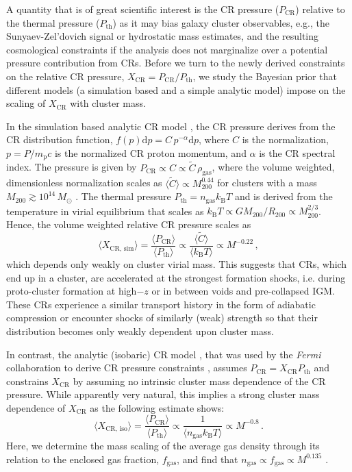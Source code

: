 \documentclass[10pt,aps,pra,reprint,amsmath,amsfonts,amssymb,showpacs,nofootinbib,floatfix]{revtex4-1}
\newcommand{\Fermi}{{\em Fermi}\xspace}
\newcommand{\rmn}{\mathrm}
\newcommand{\msun}{M_\odot}
\newcommand{\B}{\rmn{B}}
\newcommand{\bra}{\langle}
\newcommand{\ket}{\rangle}
\newcommand{\dd}{\rmn{d}}
\newcommand{\CR}{\rmn{CR}}
\newcommand{\mvir}{M_{200}}
\begin{document}
A quantity that is of great scientific interest is the CR pressure
($P_\CR$) relative to the thermal pressure ($P_\rmn{th}$) as it may
bias galaxy cluster observables, e.g., the Sunyaev-Zel’dovich signal
or hydrostatic mass estimates, and the resulting cosmological
constraints if the analysis does not marginalize over a potential
pressure contribution from CRs. Before we turn to the newly derived
constraints on the relative CR pressure, $X_\CR = P_\CR/P_\rmn{th}$,
we study the Bayesian prior that different models (a simulation based
and a simple analytic model) impose on the scaling of $X_\CR$ with
cluster mass.

In the simulation based analytic CR model \cite{2010MNRAS.409..449P},
the CR pressure derives from the CR distribution function, $f(p)\dd p =
C\,p^{-\alpha}\dd p$, where $C$ is the normalization, $p=P/m_\rmn{p}
c$ is the normalized CR proton momentum, and $\alpha$ is the CR
spectral index. The pressure is given by $P_\CR \propto C\propto
\tilde{C} \,\rho_\rmn{gas}$, where the volume weighted, dimensionless
normalization scales as $\bra\tilde{C}\ket\propto \mvir^{0.44}$ for clusters
with a mass $\mvir\gtrsim 10^{14}\,\msun$
\cite{2010MNRAS.409..449P}. The thermal pressure $P_\rmn{th} =
n_\rmn{gas} k_\B T$ and is derived from the temperature in virial
equilibrium that scales as $k_\B T \propto G \mvir/R_{200} \propto
\mvir^{2/3}$. Hence, the volume weighted relative CR pressure scales
as
\begin{equation}
    \bra X_{\CR,\,\rmn{sim}}\ket = \frac{\bra P_\CR\ket}{\bra
      P_\rmn{th}\ket} \propto \frac{\bra\tilde{C}\ket}{\bra k_\B
      T\ket} \propto M^{-0.22}\,,
\end{equation}
which depends only weakly on cluster virial mass. This suggests that
CRs, which end up in a cluster, are accelerated at the strongest
formation shocks, i.e. during proto-cluster formation at high$-z$ or
in between voids and pre-collapsed IGM. These CRs experience a
similar transport history in the form of adiabatic compression or
encounter shocks of similarly (weak) strength so that their
distribution becomes only weakly dependent upon cluster mass.

In contrast, the analytic (isobaric) CR model
\cite{2004A&A...413...17P}, that was used by the \Fermi collaboration
to derive CR pressure constraints \cite{2010ApJ...717L..71A}, assumes
$P_\CR = X_\CR P_\rmn{th}$ and constrains $X_\CR$ by assuming no
intrinsic cluster mass dependence of the CR pressure. While
apparently very natural, this implies a strong cluster mass dependence
of $X_\CR$ as the following estimate shows:
\begin{equation}
    \bra X_{\CR,\,\rmn{iso}}\ket = \frac{\bra P_\CR\ket}{\bra P_\rmn{th}\ket}
    \propto \frac{1}{\bra n_\rmn{gas} k_\B T\ket} \propto M^{-0.8}\,.
\end{equation}
Here, we determine the mass scaling of the average gas density through
its relation to the enclosed gas fraction, $f_\rmn{gas}$, and find
that $n_\rmn{gas}\propto f_\rmn{gas} \propto M^{0.135}$
\cite{2009ApJ...693.1142S}.
\end{document}
